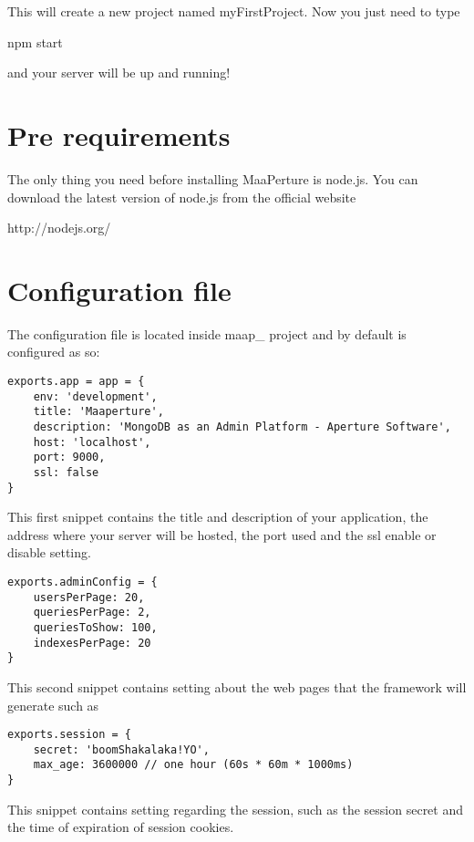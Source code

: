 This will create a new project named myFirstProject.
Now you just need to type
\begin{center}
npm start
\end{center}

and your server will be up and running!

\newpage
\section{Pre requirements}
The only thing you need before installing MaaPerture is node.js.
You can download the latest version of node.js from the official website
\begin{center}
http://nodejs.org/
\end{center}

\newpage
\section{Configuration file}

The configuration file is located inside   maap\_ project and by default is configured as so:


\begin{verbatim}
exports.app = app = {
	env: 'development',
	title: 'Maaperture',
	description: 'MongoDB as an Admin Platform - Aperture Software',
	host: 'localhost',
	port: 9000,
	ssl: false
}

\end{verbatim}

This first snippet contains the title and description of your application, the address where your server will be hosted, the port used and the ssl enable or disable setting.

\begin{verbatim}
exports.adminConfig = {
	usersPerPage: 20,
	queriesPerPage: 2,
	queriesToShow: 100,
	indexesPerPage: 20
}
\end{verbatim}

This second snippet contains setting about the web pages that the framework will generate such as 

\begin{verbatim}
exports.session = {
	secret: 'boomShakalaka!YO',
	max_age: 3600000 // one hour (60s * 60m * 1000ms)
}
\end{verbatim}

This snippet contains setting regarding the session, such as the session secret and the time of expiration of session cookies.

